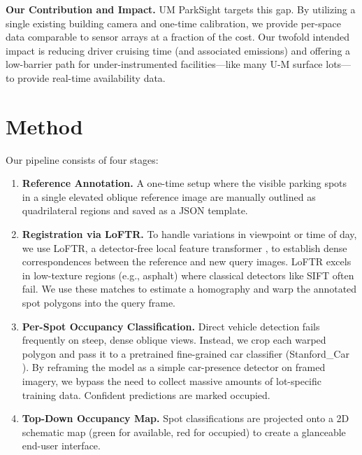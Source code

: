 \documentclass[11pt]{article}
\begin{document}
\textbf{Our Contribution and Impact.} UM ParkSight targets this gap. By utilizing a single existing building camera and one-time calibration, we provide per-space data comparable to sensor arrays at a fraction of the cost. Our twofold intended impact is reducing driver cruising time (and associated emissions) and offering a low-barrier path for under-instrumented facilities—like many U-M surface lots—to provide real-time availability data.

\section{Method}
Our pipeline consists of four stages:
\begin{enumerate}[leftmargin=1.5em]
    \item \textbf{Reference Annotation.} A one-time setup where the visible parking spots in a single elevated oblique reference image are manually outlined as quadrilateral regions and saved as a JSON template.
    
    \item \textbf{Registration via LoFTR.} To handle variations in viewpoint or time of day, we use LoFTR, a detector-free local feature transformer \cite{sun2021loftr}, to establish dense correspondences between the reference and new query images. LoFTR excels in low-texture regions (e.g., asphalt) where classical detectors like SIFT often fail. We use these matches to estimate a homography and warp the annotated spot polygons into the query frame.
    
    \item \textbf{Per-Spot Occupancy Classification.} Direct vehicle detection fails frequently on steep, dense oblique views. Instead, we crop each warped polygon and pass it to a pretrained fine-grained car classifier (Stanford\_Car \cite{roboflow_stanford_car}). By reframing the model as a simple car-presence detector on framed imagery, we bypass the need to collect massive amounts of lot-specific training data. Confident predictions are marked occupied.
    
    \item \textbf{Top-Down Occupancy Map.} Spot classifications are projected onto a 2D schematic map (green for available, red for occupied) to create a glanceable end-user interface.
\end{enumerate}
\end{document}
